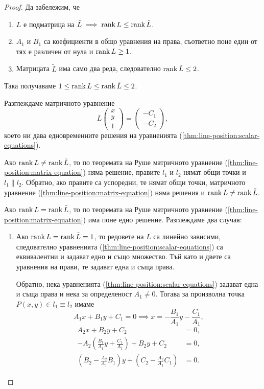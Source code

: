 \documentclass[numbers=endperiod, DIV=15]{scrartcl}
\begin{document}
\begin{proof}
  Да забележим, че
  \begin{enumerate}
    \item $L$ е подматрица на $\tilde L \implies \operatorname{rank} L \leq \operatorname{rank} \tilde L$.
    \item $A_1$ и $B_1$ са коефициенти в общо уравнения на права, съответно поне един от тях е различен от нула и $\operatorname{rank} L \geq 1$.
    \item Матрицата $\tilde L$ има само два реда, следователно $\operatorname{rank} \tilde L \leq 2$.
  \end{enumerate}

  Така получаваме $1 \leq \operatorname{rank} L \leq \operatorname{rank} \tilde L \leq 2$.

  Разглеждаме матричното уравнение
  \begin{equation}\label{thm:line-position:matrix-equation}
    L
    \begin{pmatrix}
      x \\ y \\ 1
    \end{pmatrix}
    =
    \begin{pmatrix}
      -C_1 \\ -C_2
    \end{pmatrix},
  \end{equation}
  което ни дава едновременните решения на уравненията (\ref{thm:line-position:scalar-equations}).

  Ако $\operatorname{rank} L \neq \operatorname{rank} \tilde L$, то по теоремата на Руше матричното уравнение (\ref{thm:line-position:matrix-equation}) няма решение, правите $l_1$ и $l_2$ нямат общи точки и $l_1 \parallel l_2$. Обратно, ако правите са успоредни, те нямат общи точки, матричното уравнение (\ref{thm:line-position:matrix-equation}) няма решения и $\operatorname{rank} L \neq \operatorname{rank} \tilde L$.

  Ако $\operatorname{rank} L = \operatorname{rank} \tilde L$, то по теоремата на Руше матричното уравнение (\ref{thm:line-position:matrix-equation}) има поне едно решение. Разглеждаме два случая:
  \begin{enumerate}
    \item Ако $\operatorname{rank} L = \operatorname{rank} \tilde L = 1$, то редовете на $L$ са линейно зависими, следователно уравненията (\ref{thm:line-position:scalar-equations}) са еквивалентни и задават едно и също множество. Тъй като и двете са уравнения на прави, те задават една и съща права.

    Обратно, нека уравненията (\ref{thm:line-position:scalar-equations}) задават една и съща права и нека за определеност $A_1 \neq 0$. Тогава за произволна точка $P(x, y) \in l_1 \equiv l_2$ имаме
    \begin{displaymath}
      A_1x + B_1y + C_1 = 0
      \implies
      x = - \frac {B_1} {A_1} y - \frac {C_1} {A_1},
    \end{displaymath}
    \begin{align*}
      A_2x + B_2y + C_2 &= 0,
      \\
      - A_2 \left(\frac {B_1} {A_1} y + \frac {C_1} {A_1} \right) + B_2y + C_2 &= 0,
      \\
      \left(B_2 - \frac {A_2} {A_1} B_1 \right) y + \left(C_2 - \frac {A_2} {A_1} C_1 \right) &= 0.
    \end{align*}


\end{enumerate}
\end{proof}
\end{document}
